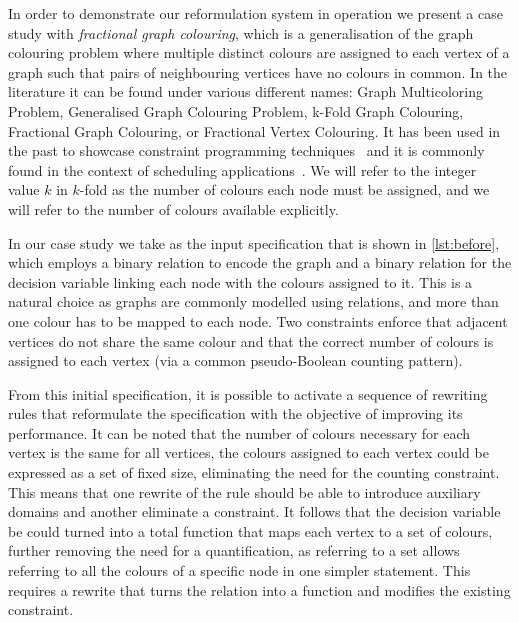 \documentclass[a4paper,UKenglish,cleveref,pdfa]{lipics-v2021}
\begin{document}
In order to demonstrate our reformulation system in operation we present a case study with {\em fractional graph colouring}, which is a generalisation of the graph colouring problem where multiple distinct colours are assigned to each vertex of a graph such that pairs of neighbouring vertices have no colours in common. In the literature it can be found under various different names: Graph Multicoloring Problem, Generalised Graph Colouring Problem, k-Fold Graph Colouring, Fractional Graph Colouring, or Fractional Vertex Colouring. It has been used in the past to showcase constraint programming techniques~\cite{gualandi2012exact,prestwich2008generalised} and it is commonly found in the context of scheduling applications~\cite{jansen2004preemptive}. We will refer to the integer value $k$ in $k$-fold as the number of colours each node must be assigned, and we will refer to the number of colours available explicitly.

In our case study we take as the input specification that is shown in \cref{lst:before}, which employs a binary relation to encode the graph and a binary relation for the decision variable linking each node with the colours assigned to it. This is a natural choice as graphs are commonly modelled using relations, and more than one colour has to be mapped to each node. Two constraints enforce that adjacent vertices do not share the same colour and that the correct number of colours is assigned to each vertex (via a common pseudo-Boolean counting pattern).

From this initial specification, it is possible to activate a sequence of rewriting rules that reformulate the specification with the objective of improving its performance. It can be noted that the number of colours necessary for each vertex is the same for all vertices, the colours assigned to each vertex could be expressed as a set of fixed size, eliminating the need for the counting constraint. This means that one rewrite of the rule should be able to introduce auxiliary domains and another eliminate a constraint.
It follows that the decision variable be could turned into a total function that maps each vertex to a set of colours, further removing the need for a quantification, as referring to a set allows referring to all the colours of a specific node in one simpler statement. This requires a rewrite that turns the relation into a function and modifies the existing constraint.
\end{document}
